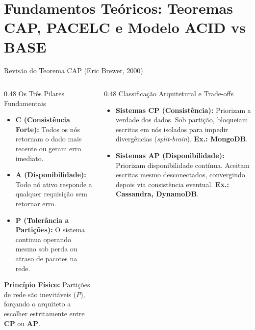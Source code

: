 \section[Fundamentos Teóricos: CAP, PACELC e ACID/BASE]{Fundamentos Teóricos: Teoremas CAP, PACELC e Modelo ACID vs BASE}

\begin{frame}{Revisão do Teorema CAP (Eric Brewer, 2000)}
  \vspace{0.1cm}
  \begin{columns}[t,onlytextwidth]
    \begin{column}{0.48\textwidth}
      \alert{Os Três Pilares Fundamentais}\par
      \footnotesize
      \begin{itemize}
        \item \textbf{C (Consistência Forte):} Todos os nós retornam o dado mais recente ou geram erro imediato.
        \item \textbf{A (Disponibilidade):} Todo nó ativo responde a qualquer requisição sem retornar erro.
        \item \textbf{P (Tolerância a Partições):} O sistema continua operando mesmo sob perda ou atraso de pacotes na rede.
      \end{itemize}
      
      \vspace{0.15cm}
      \textbf{Princípio Físico:} Partições de rede são inevitáveis ($P$), forçando o arquiteto a escolher estritamente entre \textbf{CP} ou \textbf{AP}.
    \end{column}
    
    \begin{column}{0.48\textwidth}
      \alert{Classificação Arquitetural e Trade-offs}\par
      \footnotesize
      \begin{itemize}
        \item \textbf{Sistemas CP (Consistência):} Priorizam a verdade dos dados. Sob partição, bloqueiam escritas em nós isolados para impedir divergências (\textit{split-brain}). \textbf{Ex.: MongoDB}.
        
        \item \textbf{Sistemas AP (Disponibilidade):} Priorizam disponibilidade contínua. Aceitam escritas mesmo desconectados, convergindo depois via consistência eventual. \textbf{Ex.: Cassandra, DynamoDB}.
      \end{itemize}
    \end{column}
  \end{columns}
\end{frame}

